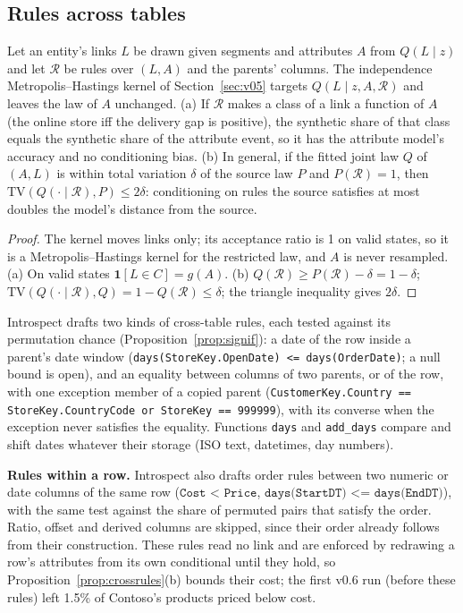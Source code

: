 \subsection{Rules across tables}
\begin{proposition}\label{prop:crossrules}
Let an entity's links $L$ be drawn given segments and attributes $A$ from $Q(L\mid z)$ and let $\mathcal R$ be rules over $(L,A)$ and the parents' columns. The independence Metropolis--Hastings kernel of Section~\ref{sec:v05} targets $Q(L\mid z,A,\mathcal R)$ and leaves the law of $A$ unchanged. (a) If $\mathcal R$ makes a class of a link a function of $A$ (the online store iff the delivery gap is positive), the synthetic share of that class equals the synthetic share of the attribute event, so it has the attribute model's accuracy and no conditioning bias. (b) In general, if the fitted joint law $Q$ of $(A,L)$ is within total variation $\delta$ of the source law $P$ and $P(\mathcal R)=1$, then $\mathrm{TV}(Q(\cdot\mid\mathcal R),P)\le2\delta$: conditioning on rules the source satisfies at most doubles the model's distance from the source.
\end{proposition}
\begin{proof}
The kernel moves links only; its acceptance ratio is 1 on valid states, so it is a Metropolis--Hastings kernel for the restricted law, and $A$ is never resampled. (a) On valid states $\mathbf 1[L\in C]=g(A)$. (b) $Q(\mathcal R)\ge P(\mathcal R)-\delta=1-\delta$; $\mathrm{TV}(Q(\cdot\mid\mathcal R),Q)=1-Q(\mathcal R)\le\delta$; the triangle inequality gives $2\delta$.
\end{proof}
\noindent Introspect drafts two kinds of cross-table rules, each tested against its permutation chance (Proposition~\ref{prop:signif}): a date of the row inside a parent's date window (\texttt{days(StoreKey.OpenDate) <= days(OrderDate)}; a null bound is open), and an equality between columns of two parents, or of the row, with one exception member of a copied parent (\texttt{CustomerKey.Country == StoreKey.CountryCode or StoreKey == 999999}), with its converse when the exception never satisfies the equality. Functions \texttt{days} and \texttt{add\_days} compare and shift dates whatever their storage (ISO text, datetimes, day numbers).

\noindent\textbf{Rules within a row.} Introspect also drafts order rules between two numeric or date columns of the same row ($\texttt{Cost < Price}$, $\texttt{days(StartDT) <= days(EndDT)}$), with the same test against the share of permuted pairs that satisfy the order. Ratio, offset and derived columns are skipped, since their order already follows from their construction. These rules read no link and are enforced by redrawing a row's attributes from its own conditional until they hold, so Proposition~\ref{prop:crossrules}(b) bounds their cost; the first v0.6 run (before these rules) left 1.5\% of Contoso's products priced below cost.

